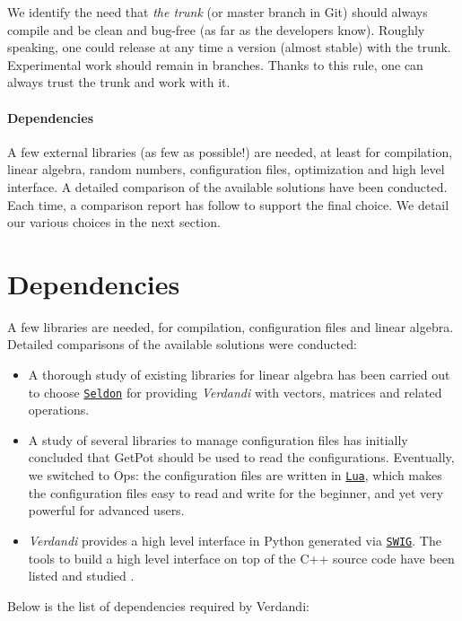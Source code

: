 \documentclass{tufte-book}
\begin{document}
\begin{itemize}
We identify the need that \emph{the trunk} (or master branch in Git) should always compile and be clean and
bug-free (as far as the developers know). Roughly speaking, one could release
at any time a version (almost stable) with the trunk. Experimental work should
remain in branches. Thanks to this rule, one can always trust the trunk and work with
it.

\paragraph{Dependencies}
A few external libraries (as few as possible!) are needed, at least for compilation, linear
algebra, random numbers, configuration files, optimization and high level interface. A
detailed comparison of the available solutions have been conducted. Each time,
a comparison report has follow to support the final choice. We detail our various choices in the next section.

\hypertarget{installation_dependencies}{}\section{\-Dependencies}\label{installation_dependencies}

A few libraries are needed, for compilation, configuration files and linear algebra. Detailed comparisons of the available solutions were conducted:

\begin{itemize}
\item A thorough study of existing libraries for linear algebra \cite{linear_algebra} has been carried out to choose \href{http://seldon.sourceforge.net/}{\tt \-Seldon}  for providing \emph{Verdandi} with vectors, matrices and related operations.

\item A study of several libraries to manage configuration files \cite{configuration_library} has initially concluded that GetPot should be used to read the configurations. Eventually, we switched to Ops: the configuration files are written in \href{http://www.lua.org}{\tt \-Lua}, which makes the configuration files easy to read and write for the beginner, and yet very powerful for advanced users.

\item \emph{Verdandi} provides a high level interface in Python generated via \href{http://www.swig.org/}{\tt \-S\-W\-I\-G}. The tools to build a high level interface on top of the C++ source code have been listed and studied \cite{high_level_interface}.
\end{itemize}
Below is  the list of dependencies required by Verdandi:


\end{itemize}
\end{document}
